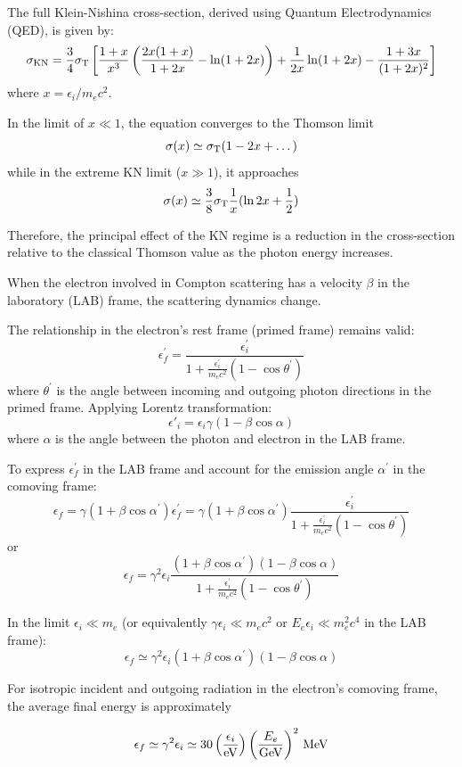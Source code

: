 The full Klein-Nishina cross-section, derived using Quantum Electrodynamics (QED), is given by:
%
\[
\sigma_{\rm KN} = \frac{3}{4} \sigma_{\rm T} \left[ \frac{1+x}{x^3} \left(\frac{2x(1+x)}{1+2x} - \ln (1+2x)\right) + \frac{1}{2x} \ln (1+2x) - \frac{1+3x}{(1+2x)^2} \right]
\]
%
where \( x = \epsilon_i / m_e c^2 \).

In the limit of \( x \ll 1 \), the equation converges to the Thomson limit \[ \sigma(x) \simeq \sigma_{\rm T} (1-2x+\dots) \] while in the extreme KN limit (\( x \gg 1 \)), it approaches \[ \sigma(x) \simeq \frac{3}{8} \sigma_{\rm T} \frac{1}{x} (\ln 2x + \frac{1}{2}) \]

Therefore, the principal effect of the KN regime is a reduction in the cross-section relative to the classical Thomson value as the photon energy increases.


When the electron involved in Compton scattering has a velocity \( \beta \) in the laboratory (LAB) frame, the scattering dynamics change.

The relationship in the electron's rest frame (primed frame) remains valid:
%
\[
\epsilon^\prime_f = \frac{\epsilon^\prime_i}{1+ \frac{\epsilon^\prime_i}{m_e c^2} (1-\cos\theta^\prime)}
\]
%
where \( \theta^\prime \) is the angle between incoming and outgoing photon directions in the primed frame. Applying Lorentz transformation:
%
\[
\epsilon'_i = \epsilon_i \gamma (1-\beta \cos \alpha)
\]
%
where \( \alpha \) is the angle between the photon and electron in the LAB frame.

To express \( \epsilon^\prime_f \) in the LAB frame and account for the emission angle \( \alpha^\prime \) in the comoving frame:
%
\[
\epsilon_f = \gamma(1+\beta \cos\alpha^\prime) \epsilon^\prime_f = 
\gamma (1+\beta \cos \alpha^\prime) \frac{\epsilon^\prime_i}{1+ \frac{\epsilon^\prime_i}{m_e c^2} (1-\cos\theta^\prime)}
\]
%
or
\[
\epsilon_f = \gamma^2 \epsilon_i \frac{(1+\beta \cos\alpha^\prime)(1-\beta \cos\alpha)}{1+ \frac{\epsilon^\prime_i}{m_e c^2} (1-\cos\theta^\prime)}
\]

In the limit \( \epsilon_i \ll m_e \) (or equivalently \( \gamma \epsilon_i \ll m_e c^2 \) or \( E_e \epsilon_i \ll m_e^2 c^4 \) in the LAB frame):
%
\[
\epsilon_f \simeq \gamma^2 \epsilon_i (1+\beta \cos\alpha^\prime)(1-\beta \cos\alpha)
\]

For isotropic incident and outgoing radiation in the electron's comoving frame, the average final energy is approximately 
%
\begin{remark}
\[
 \epsilon_f \simeq \gamma^2 \epsilon_i \simeq 30 \left(\frac{\epsilon_i}{\rm eV}\right)\left(\frac{E_e}{\rm GeV}\right)^2 \, \text{MeV}   
\]
\end{remark}

